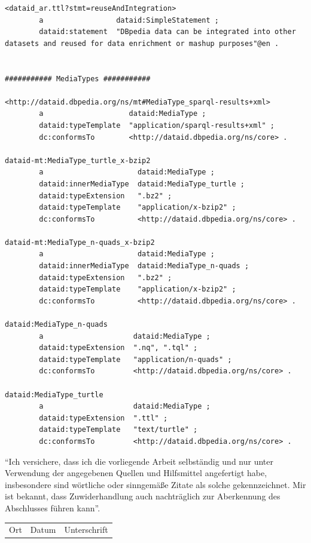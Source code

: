 \documentclass[a4paper,english,twoside,BCOR1.5cm,headsepline,DIV12,appendixprefix,final,12pt]{scrbook}
\begin{document}
\begin{lstlisting}[language=ttl, captionpos=b, label=lst:dcex,linewidth=\columnwidth,breaklines=true,basicstyle=\ttfamily\scriptsize]
<dataid_ar.ttl?stmt=reuseAndIntegration>
        a                 dataid:SimpleStatement ;
        dataid:statement  "DBpedia data can be integrated into other datasets and reused for data enrichment or mashup purposes"@en .


########### MediaTypes ###########

<http://dataid.dbpedia.org/ns/mt#MediaType_sparql-results+xml>
        a                    dataid:MediaType ;
        dataid:typeTemplate  "application/sparql-results+xml" ;
        dc:conformsTo        <http://dataid.dbpedia.org/ns/core> .

dataid-mt:MediaType_turtle_x-bzip2
        a                      dataid:MediaType ;
        dataid:innerMediaType  dataid:MediaType_turtle ;
        dataid:typeExtension   ".bz2" ;
        dataid:typeTemplate    "application/x-bzip2" ;
        dc:conformsTo          <http://dataid.dbpedia.org/ns/core> .

dataid-mt:MediaType_n-quads_x-bzip2
        a                      dataid:MediaType ;
        dataid:innerMediaType  dataid:MediaType_n-quads ;
        dataid:typeExtension   ".bz2" ;
        dataid:typeTemplate    "application/x-bzip2" ;
        dc:conformsTo          <http://dataid.dbpedia.org/ns/core> .

dataid:MediaType_n-quads
        a                     dataid:MediaType ;
        dataid:typeExtension  ".nq", ".tql" ;
        dataid:typeTemplate   "application/n-quads" ;
        dc:conformsTo         <http://dataid.dbpedia.org/ns/core> .

dataid:MediaType_turtle
        a                     dataid:MediaType ;
        dataid:typeExtension  ".ttl" ;
        dataid:typeTemplate   "text/turtle" ;
        dc:conformsTo         <http://dataid.dbpedia.org/ns/core> .
\end{lstlisting}

\thispagestyle{empty}
"`Ich versichere, dass ich die vorliegende Arbeit selbständig und nur unter Verwendung der angegebenen Quellen und Hilfsmittel angefertigt habe, insbesondere sind wörtliche oder sinngemäße Zitate als solche gekennzeichnet. Mir ist bekannt, dass Zuwiderhandlung auch nachträglich zur Aberkennung des Abschlusses führen kann"'.

\vspace{3cm}
\begin{tabularx}{\linewidth}{X X X}
Ort & Datum	& Unterschrift\\
\end{tabularx}
\end{document}
